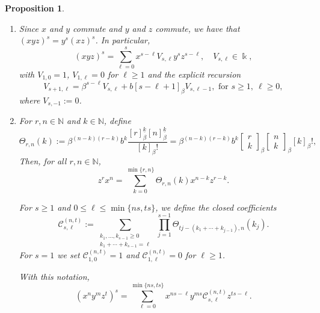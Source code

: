\documentclass{amsart}
\newtheorem{proposition}[theorem]{Proposition}
\theoremstyle{definition}
\theoremstyle{remark}
\numberwithin{equation}{section}
\begin{document}
\begin{proposition}
\begin{enumerate}
\item[\rm (3)] Since $x$ and $y$ commute and $y$ and $z$ commute, we have that $(xyz)^s=y^{s}(xz)^s$. In particular, 
\begin{equation}\label{Vdefconstbcomm2iv}
(xyz)^s=\sum_{\ell=0}^{s} x^{s-\ell}V_{s,\ell}y^{s}z^{s-\ell}, \quad V_{s,\ell}\in\Bbbk,
\end{equation}
with $V_{1,0}=1$, $V_{1,\ell}=0$ for $\ell\ge 1$ and the explicit recursion
\begin{equation}\label{Vrecconstbcomm2iv}
V_{s+1,\ell}=\beta^{s-\ell}V_{s,\ell}+b[s-\ell+1]_{\beta}V_{s,\ell-1}, \text{ for } s\ge 1,\ \ell\ge 0,
\end{equation}
where $V_{s,-1}:=0$.

\item[\rm (4)] For $r,n\in \mathbb{N}$ and $k\in \mathbb{N}$, define
\begin{equation}\label{ThetaqWeyl2iv}
\Theta_{r,n}(k):={\beta}^{(n-k)(r-k)}b^{k}
\frac{[r]^{\underline{k}}_{\beta}[n]^{\underline{k}}_{\beta}}{[k]_{\beta}!}
=\beta^{(n-k)(r-k)}b^{k}\begin{bmatrix}r\\ k\end{bmatrix}_{\beta}\begin{bmatrix}n\\ k\end{bmatrix}_{\beta}[k]_{\beta}!,
\end{equation}
Then, for all $r,n\in \mathbb{N}$,
\begin{equation}\label{zrxnclosedqWeyl2iv}
z^{r}x^{n}=\sum_{k=0}^{\min\{r,n\}}\Theta_{r,n}(k)x^{n-k}z^{r-k}.
\end{equation}

For $s\ge 1$ and $0\le \ell\le \min\{ns,ts\}$, we define the closed coefficients
\begin{equation}\label{Cmultisumexplicit2iv}
\mathcal C^{(n,t)}_{s,\ell}:=\sum_{\substack{k_1,\dots,k_{s-1}\ge 0\\ k_1+\cdots+k_{s-1}=\ell}}
\ \prod_{j=1}^{s-1}\Theta_{tj-(k_1+\cdots+k_{j-1}),n}(k_j).
\end{equation}
For $s=1$ we set $\mathcal C^{(n,t)}_{1,0}=1$ and $\mathcal C^{(n,t)}_{1,\ell}=0$ for $\ell\ge 1$.

With this notation, 
\begin{equation}\label{xyzorder2iv}
(x^n y^m z^t)^s=\sum_{\ell=0}^{\min\{ns,ts\}}x^{ns-\ell}y^{ms}\mathcal C^{(n,t)}_{s,\ell}z^{ts-\ell}.
\end{equation}


\end{enumerate}
\end{proposition}
\end{document}
